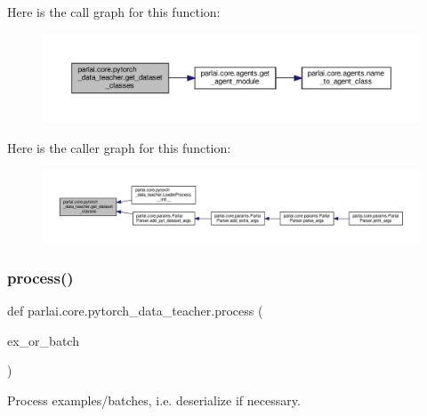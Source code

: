 Here is the call graph for this function\+:
\nopagebreak
\begin{figure}[H]
\begin{center}
\leavevmode
\includegraphics[width=350pt]{namespaceparlai_1_1core_1_1pytorch__data__teacher_acd56d9ac5d68831c1e91690f26eb2328_cgraph}
\end{center}
\end{figure}
Here is the caller graph for this function\+:
\nopagebreak
\begin{figure}[H]
\begin{center}
\leavevmode
\includegraphics[width=350pt]{namespaceparlai_1_1core_1_1pytorch__data__teacher_acd56d9ac5d68831c1e91690f26eb2328_icgraph}
\end{center}
\end{figure}
\mbox{\label{namespaceparlai_1_1core_1_1pytorch__data__teacher_a7b71207eb86027bc93809c1e4d57f641}} 
\subsubsection{\texorpdfstring{process()}{process()}}
{\footnotesize\ttfamily def parlai.\+core.\+pytorch\+\_\+data\+\_\+teacher.\+process (\begin{DoxyParamCaption}\item[{}]{ex\+\_\+or\+\_\+batch }\end{DoxyParamCaption})}

\begin{DoxyVerb}Process examples/batches, i.e. deserialize if necessary.\end{DoxyVerb}
 

